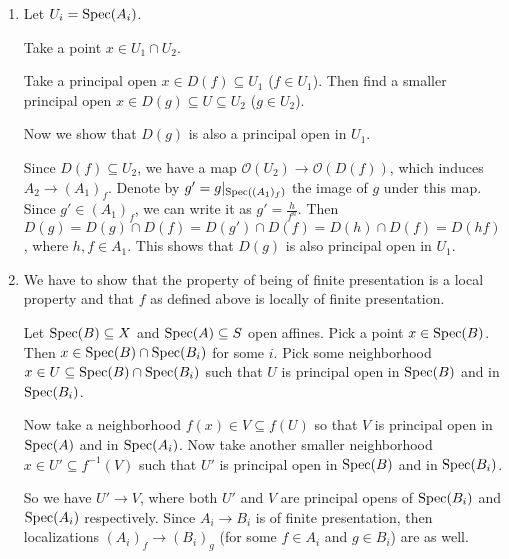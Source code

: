 \begin{exercise}{4}
    \begin{enumerate}
        \item{
                Let $U_i = \operatorname{Spec}(A_i)$.

                Take a point $x \in U_1 \cap U_2$.

                Take a principal open $x \in D(f) \subseteq U_1$ ($f \in U_1$).
                Then find a smaller principal open $x \in D(g) \subseteq U
                \subseteq U_2$ ($g \in U_2$).

                Now we show that $D(g)$ is also a principal open in $U_1$.

                Since $D(f) \subseteq U_2$, we have a map $\mathcal{O}(U_2) \to
                \mathcal{O}(D(f))$, which induces $A_2 \to (A_1)_f$. Denote by
                $g' = g |_{\operatorname{Spec}((A_1)_f)}$ the image of $g$ under this map.
                Since $g' \in (A_1)_f$, we can write it as $g' = \frac{h}{f^n}$.
                Then $D(g) = D(g) \cap D(f) = D(g') \cap D(f) = D(h) \cap D(f) =
                D(hf)$, where $h, f \in A_1$. This shows that $D(g)$ is also
                principal open in $U_1$.
            }
        \item{
                We have to show that the property of being of finite
                presentation is a local property and that $f$ as defined above
                is locally of finite presentation.

                Let $\operatorname{Spec}(B) \subseteq X$ and $\operatorname{Spec}(A) \subseteq S$ open
                affines.
                Pick a point $x \in \operatorname{Spec}(B)$. Then $x \in \operatorname{Spec}(B) \cap
                \operatorname{Spec}(B_i)$ for some $i$. Pick some neighborhood $x \in U \subseteq \operatorname{Spec}(B) \cap
                \operatorname{Spec}(B_i)$ such that $U$ is principal open in $\operatorname{Spec}(B)$
                and in $\operatorname{Spec}(B_i)$.

                Now take a neighborhood $f(x) \in V \subseteq f(U)$ so that $V$
                is principal open in $\operatorname{Spec}(A)$ and in $\operatorname{Spec}(A_i)$.
                Now take another smaller neighborhood $x \in U' \subseteq
                f^{-1}(V)$ such that $U'$ is principal open in $\operatorname{Spec}(B)$ and in
                $\operatorname{Spec}(B_i)$.

                So we have $U' \to V$, where both $U'$ and $V$ are principal
                opens of $\operatorname{Spec}(B_i)$ and $\operatorname{Spec}(A_i)$ respectively. Since $A_i
                \to B_i$ is of finite presentation, then localizations $(A_i)_f
                \to (B_i)_g$ (for some $f \in A_i$ and $g \in B_i$) are as well.

}
\end{enumerate}
\end{exercise}
